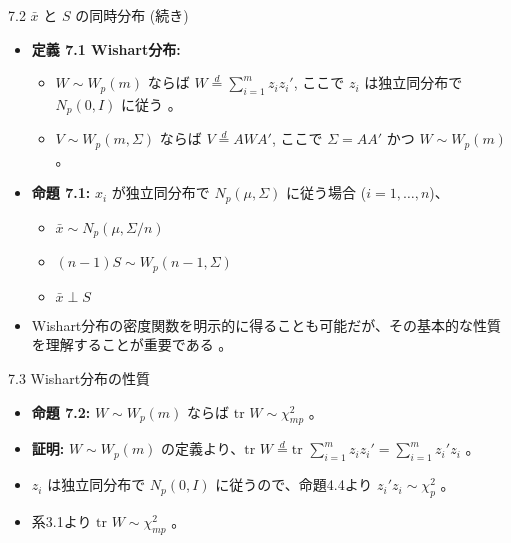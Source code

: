\documentclass[aspectratio=169]{beamer}
\begin{document}
\begin{CJK}{UTF8}{min}
\begin{frame}{7.2 $\bar{x}$ と $S$ の同時分布 (続き)}
\begin{itemize}
    \item \textbf{定義 7.1 Wishart分布:}
    \begin{itemize}
        \item $W \sim W_p(m)$ ならば $W \overset{d}{=} \sum_{i=1}^{m} z_i z_i'$, ここで $z_i$ は独立同分布で $N_p(0, I)$ に従う 。
        \item $V \sim W_p(m, \Sigma)$ ならば $V \overset{d}{=} AWA'$, ここで $\Sigma=AA'$ かつ $W \sim W_p(m)$ 。
    \end{itemize}
    \item \textbf{命題 7.1:} $x_i$ が独立同分布で $N_p(\mu, \Sigma)$ に従う場合 ($i=1, \dots, n$)、
    \begin{itemize}
        \item $\bar{x} \sim N_p(\mu, \Sigma/n)$ 
        \item $(n-1)S \sim W_p(n-1, \Sigma)$ 
        \item $\bar{x} \perp S$ 
    \end{itemize}
    \item Wishart分布の密度関数を明示的に得ることも可能だが、その基本的な性質を理解することが重要である 。
\end{itemize}
\end{frame}

\begin{frame}{7.3 Wishart分布の性質}
\begin{itemize}
    \item \textbf{命題 7.2:} $W \sim W_p(m)$ ならば $\text{tr } W \sim \chi^2_{mp}$ 。
    \item \textbf{証明:} $W \sim W_p(m)$ の定義より、$\text{tr } W \overset{d}{=} \text{tr } \sum_{i=1}^{m} z_i z_i' = \sum_{i=1}^{m} z_i' z_i$ 。
    \item $z_i$ は独立同分布で $N_p(0, I)$ に従うので、命題4.4より $z_i' z_i \sim \chi^2_p$ 。
    \item 系3.1より $\text{tr } W \sim \chi^2_{mp}$ 。
\end{itemize}
\end{frame}


\end{CJK}
\end{document}
